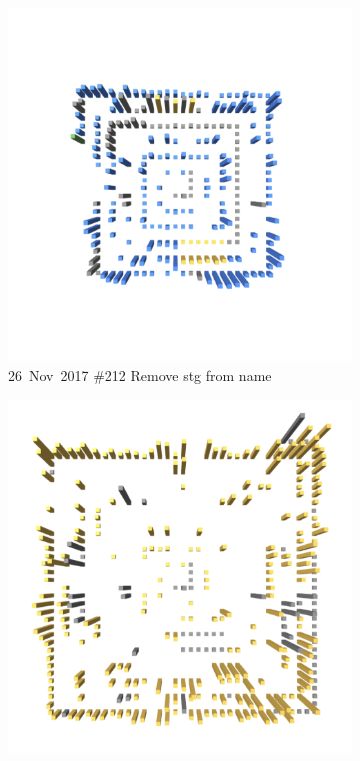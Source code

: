 \begin{figure}[ht]
\begin{subfigure}{0.32\textwidth}
        \includegraphics[width=\linewidth]{JetUML_V0S8.png}
        \caption{\mbox{26 Nov 2017}  \hfill  \linebreak  \#212 Remove stg from name} 
        \label{fig:JetUML_V0S8}
    \end{subfigure}
    \hspace*{\fill}
    \begin{subfigure}{0.32\textwidth}
        \includegraphics[width=\linewidth]{JetUML_V0S9.png}

\end{subfigure}
\end{figure}
